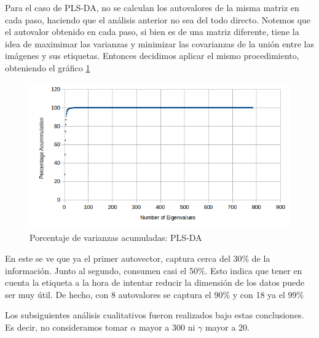 Para el caso de PLS-DA, no se calculan los autovalores de la misma matriz en cada paso, haciendo que el an\'alisis anterior no sea del todo directo. Notemos que el autovalor obtenido en cada paso, si bien es de una matriz diferente, tiene la idea de maximimar las varianzas y minimizar las covarianzas de la uni\'on entre las im\'agenes y sus etiquetas. Entonces decidimos aplicar el mismo procedimiento, obteniendo el gr\'afico \ref{accum_var_PLSDA}

\begin{figure}[h!]
  \begin{center}
	\includegraphics[scale=1]{exp4/PLSDA-percentage.png}
	\caption{Porcentaje de varianzas acumuladas: PLS-DA}
	\label{accum_var_PLSDA}
  \end{center}
\end{figure}

En este se ve que ya el primer autovector, captura cerca del 30\% de la informaci\'on. Junto al segundo, consumen casi el 50\%. Esto indica que tener en cuenta la etiqueta a la hora de intentar reducir la dimensi\'on de los datos puede ser muy \'util. De hecho, con 8 autovalores se captura el 90\% y con 18 ya el 99\%

Los subsiguientes an\'alisis cualitativos fueron realizados bajo estas conclusiones. Es decir, no consideramos tomar $\alpha$ mayor a 300 ni $\gamma$ mayor a 20.